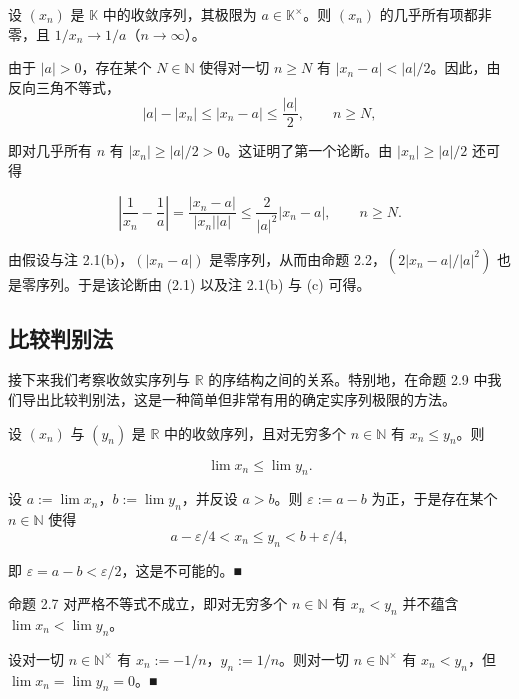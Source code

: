 \begin{proposition}

设 $ (x_n) $ 是 $ \mathbb{K} $ 中的收敛序列，其极限为 $ a \in \mathbb{K}^\times $。则 $ (x_n) $ 的几乎所有项都非零，且 $ 1/x_n \to 1/a $（$ n \to \infty $）。

\proofhead
由于 $ |a| > 0 $，存在某个 $ N \in \mathbb{N} $ 使得对一切 $ n \geq N $ 有 $ |x_n - a| < |a|/2 $。因此，由反向三角不等式，
\[
|a|-|x_{n}|\leq|x_{n}-a|\leq\frac{|a|}{2},\qquad n\geq N,
\]

即对几乎所有 $ n $ 有 $ |x_n| \geq |a|/2 > 0 $。这证明了第一个论断。由 $ |x_n| \geq |a|/2 $ 还可得

\begin{equation}
\left|\frac{1}{x_{n}}-\frac{1}{a}\right|=\frac{\left|x_{n}-a\right|}{\left|x_{n}\right|\left|a\right|}\leq\frac{2}{\left|a\right|^{2}}\left|x_{n}-a\right|,\qquad n\geq N.
\end{equation}

由假设与注 2.1(b)，$(|x_n-a|)$ 是零序列，从而由命题 2.2，$(2|x_n-a|/|a|^2)$ 也是零序列。于是该论断由 (2.1) 以及注 2.1(b) 与 (c) 可得。

\end{proposition}

\subsection*{比较判别法}

接下来我们考察收敛实序列与 $ \mathbb{R} $ 的序结构之间的关系。特别地，在命题 2.9 中我们导出比较判别法，这是一种简单但非常有用的确定实序列极限的方法。

\begin{proposition}

设 $ (x_n) $ 与 $ (y_n) $ 是 $ \mathbb{R} $ 中的收敛序列，且对无穷多个 $ n \in \mathbb{N} $ 有 $ x_n \leq y_n $。则

\[
\lim x_{n}\leq\lim y_{n}.
\]

\proofhead
设 $ a := \lim x_n $，$ b := \lim y_n $，并反设 $ a > b $。则 $ \varepsilon := a - b $ 为正，于是存在某个 $ n \in \mathbb{N} $ 使得
\[
a-\varepsilon/4<x_{n}\leq y_{n}<b+\varepsilon/4,
\]

即 $ \varepsilon = a - b < \varepsilon/2 $，这是不可能的。■

\end{proposition}

\begin{remark}

命题 2.7 对严格不等式不成立，即对无穷多个 $ n \in \mathbb{N} $ 有 $ x_n < y_n $ 并不蕴含 $ \lim x_n < \lim y_n $。

\proofhead
设对一切 $ n \in \mathbb{N}^\times $ 有 $ x_n := -1/n $，$ y_n := 1/n $。则对一切 $ n \in \mathbb{N}^\times $ 有 $ x_n < y_n $，但 $ \lim x_n = \lim y_n = 0 $。■
\end{remark}


